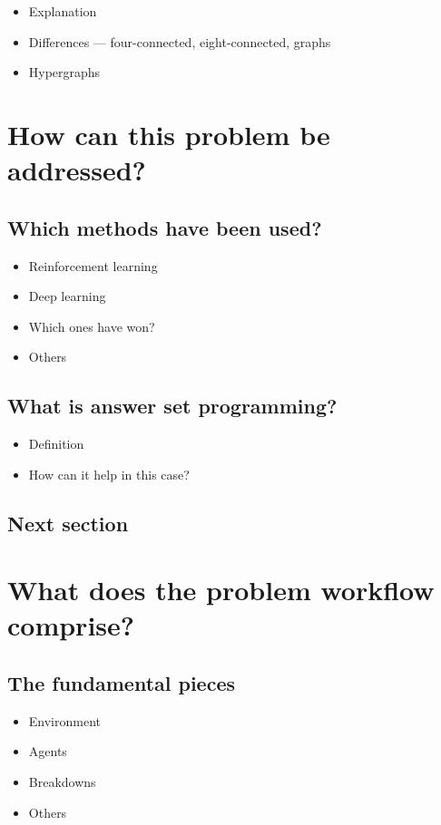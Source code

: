 \documentclass[11pt]{article}
\begin{document}
\begin{itemize}
  \item Explanation
  \item Differences — four-connected, eight-connected, graphs
  \item Hypergraphs
\end{itemize}

\pagebreak
\section{How can this problem be addressed?}
\subsection{Which methods have been used?}
\begin{itemize}
  \item Reinforcement learning
  \item Deep learning
  \item Which ones have won?
  \item Others
\end{itemize}

\subsection{What is answer set programming?}
\begin{itemize}
  \item Definition
  \item How can it help in this case?
\end{itemize}

\subsection{Next section}

\pagebreak
\section{What does the problem workflow comprise?}
\subsection{The fundamental pieces}
\begin{itemize}
  \item Environment
  \item Agents
  \item Breakdowns
  \item Others
\end{itemize} 


\end{document}
